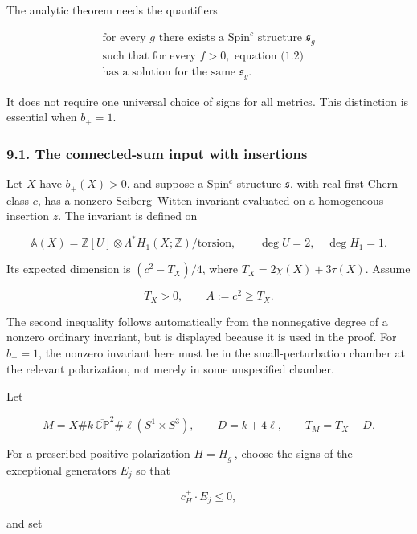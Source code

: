 \documentclass[
  10pt,
]{article}
\begin{document}
The analytic theorem needs the quantifiers

\[
 \boxed{\begin{gathered}
   \text{for every }g\text{ there exists a Spin}^c
       \text{ structure }\mathfrak s_g\\
   \text{such that for every }f>0,\text{ equation (1.2)}\\
   \text{has a solution for the same }\mathfrak s_g.
 \end{gathered}}
 \tag{9.1}
\]

It does not require one universal choice of signs for all metrics. This
distinction is essential when \(b_+=1\).

\hypertarget{the-connected-sum-input-with-insertions}{%
\subsubsection{9.1. The connected-sum input with
insertions}\label{the-connected-sum-input-with-insertions}}

Let \(X\) have \(b_+(X)>0\), and suppose a Spin\(^c\) structure
\(\mathfrak s\), with real first Chern class \(c\), has a nonzero
Seiberg--Witten invariant evaluated on a homogeneous insertion \(z\).
The invariant is defined on

\[
 \mathbb A(X)=\mathbb Z[U]\otimes\Lambda^*H_1(X;\mathbb Z)/\mathrm{torsion},
                 \qquad\deg U=2,\quad\deg H_1=1.
\]

Its expected dimension is \((c^2-T_X)/4\), where
\(T_X=2\chi(X)+3\tau(X)\). Assume

\[
                    T_X>0,\qquad A:=c^2\ge T_X.          \tag{9.2}
\]

The second inequality follows automatically from the nonnegative degree
of a nonzero ordinary invariant, but is displayed because it is used in
the proof. For \(b_+=1\), the nonzero invariant here must be in the
small-perturbation chamber at the relevant polarization, not merely in
some unspecified chamber.

Let

\[
 M=X\#k\,\overline{\mathbb{CP}}^{2}\#\ell(S^1\times S^3),
 \qquad D=k+4\ell,\qquad T_M=T_X-D.                      \tag{9.3}
\]

For a prescribed positive polarization \(H=H_g^+\), choose the signs of
the exceptional generators \(E_j\) so that

\[
                         c_H^+\mathbin\cdot E_j\le0,
\]

and set
\end{document}
